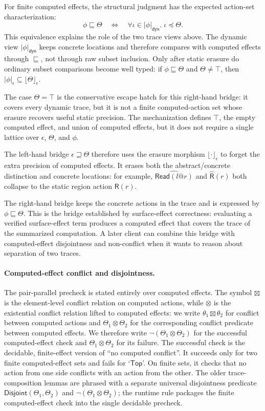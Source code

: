 \documentclass[10pt,a4paper]{article}
\makeatletter
\newcommand{\conflict}{\mathrel{\otimes}}             %
\newcommand{\elemconf}{\mathrel{\boxtimes}}           %
\newcommand{\approxx}{\mathrel{\sqsubseteq}}          %
\newcommand{\Read}{\mathsf{Read}}
\newcommand{\Rs}{\mathsf{R}}
\newcommand{\Rhat}{\widehat{\mathsf{R}}}
\newcommand{\Top}{\mathsf{Top}}
\newcommand{\at}{\mathord{@}}
\newcommand{\Disjoint}{\mathsf{Disjoint}}
\newcommand{\effconflict}{\mathrel{\otimes}}
\newcommand{\dynset}[1]{\lvert #1\rvert_{\mathsf{dyn}}}
\newcommand{\staticset}[1]{\lvert #1\rvert_{\epsilon}}
\newcommand{\cerase}[1]{\lfloor #1 \rfloor_{\epsilon}}
\newcommand{\actleq}{\mathrel{\preccurlyeq}}
\newcommand{\covers}{\mathrel{\sqsupseteq}}
\makeatother
\begin{document}
For finite computed effects, the structural judgment has the expected
action-set characterization:
\[
\phi\approxx\Theta
\quad\Longleftrightarrow\quad
\forall\iota\in\dynset{\phi}.\;\iota\actleq\Theta.
\]
This equivalence explains the role of the two trace views above.  The dynamic
view $\dynset{\phi}$ keeps concrete locations and therefore compares
with computed effects through $\approxx$, not through raw subset inclusion.
Only after static erasure do ordinary subset comparisons become well typed: if
$\phi\approxx\Theta$ and $\Theta\neq\top$, then
$\staticset{\phi}\subseteq\cerase{\Theta}$.

The case $\Theta=\top$ is the conservative escape hatch for this right-hand
bridge: it covers every dynamic trace, but it is not a finite computed-action
set whose erasure recovers useful static precision.  The mechanization defines
$\top$, the empty computed effect, and union of computed effects, but it does
not require a single lattice over $\epsilon$, $\Theta$, and $\phi$.

The left-hand bridge $\epsilon\covers\Theta$ therefore uses the erasure morphism
$\cerase{\cdot}$ to forget the extra precision of computed effects. It erases
both the abstract/concrete distinction and concrete locations: for example,
$\widehat{\Read(l\at r)}$ and $\Rhat(r)$ both collapse to the static region
action $\Rs(r)$.

The right-hand bridge keeps the concrete actions in the trace and is expressed
by $\phi\approxx\Theta$. This is the bridge established by surface-effect
correctness: evaluating a verified surface-effect term produces a computed
effect that covers the trace of the summarized computation. A later client can
combine this bridge with computed-effect disjointness and non-conflict when it
wants to reason about separation of two traces.

\paragraph{Computed-effect conflict and disjointness.}\label{sec:disjoint}
The pair-parallel precheck is stated entirely over computed effects. The symbol
$\boxtimes$ is the element-level conflict relation on computed actions, while
$\otimes$ is the existential conflict relation lifted to computed effects:
we write $\theta_1\elemconf\theta_2$ for conflict between computed actions and
$\Theta_1\conflict\Theta_2$ for the corresponding conflict predicate between
computed effects. We therefore write
$\neg(\Theta_1 \effconflict \Theta_2)$ for the successful computed-effect check
and $\Theta_1 \effconflict \Theta_2$ for its failure. The successful check is the
decidable, finite-effect version of ``no computed conflict''. It succeeds only
for two finite computed-effect sets and fails for `$\Top$'. On finite sets, it
checks that no action from one side conflicts with an action from the other.
The older trace-composition lemmas are phrased with a separate universal
disjointness predicate $\Disjoint(\Theta_1,\Theta_2)$ and
$\neg(\Theta_1\conflict\Theta_2)$; the runtime rule packages the finite
computed-effect check into the single decidable precheck.
\end{document}
